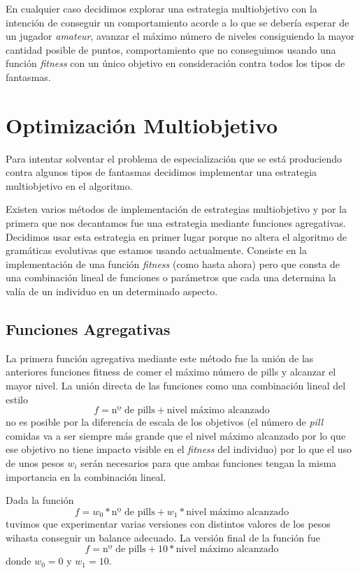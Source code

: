 En cualquier caso decidimos explorar una estrategia multiobjetivo con la intención de conseguir un comportamiento acorde a lo que se debería esperar de un jugador \textit{amateur}, avanzar el máximo número de niveles consiguiendo la mayor cantidad posible de puntos, comportamiento que no conseguimos usando una función \textit{fitness} con un único objetivo en consideración contra todos los tipos de fantasmas.

\section{Optimización Multiobjetivo}
Para intentar solventar el problema de especialización que se está produciendo contra algunos tipos de fantasmas decidimos implementar una estrategia multiobjetivo en el algoritmo.

Existen varios métodos de implementación de estrategias multiobjetivo y por la primera que nos decantamos fue una estrategia mediante funciones agregativas. Decidimos usar esta estrategia en primer lugar porque no altera el algoritmo de gramáticas evolutivas que estamos usando actualmente. Consiste en la implementación de una función \textit{fitness} (como hasta ahora) pero que consta de una combinación lineal de funciones o parámetros que cada una determina la valía de un individuo en un determinado aspecto.

\subsection{Funciones Agregativas}
La primera función agregativa mediante este método fue la unión de las anteriores funciones fitness de comer el máximo número de pills y alcanzar el mayor nivel. La unión directa de las funciones como una combinación lineal del estilo
\begin{equation*}
f = \textrm{nº de pills} + \textrm{nivel máximo alcanzado}
\end{equation*}
no es posible por la diferencia de escala de los objetivos (el número de \textit{pill} comidas va a ser siempre más grande que el nivel máximo alcanzado por lo que ese objetivo no tiene impacto visible en el \textit{fitness} del individuo) por lo que el uso de unos pesos $w_i$ serán necesarios para que ambas funciones tengan la misma importancia en la combinación lineal.

Dada la función
\begin{equation*}
f = w_0 * \textrm{nº de pills} + w_1 * \textrm{nivel máximo alcanzado}
\end{equation*}
tuvimos que experimentar varias versiones con distintos valores de los pesos wihasta conseguir un balance adecuado. La versión final de la función fue
\begin{equation*}
f = \textrm{nº de pills} + 10 * \textrm{nivel máximo alcanzado}
\end{equation*}
donde $w_0 = 0$ y $w_1 = 10$.


